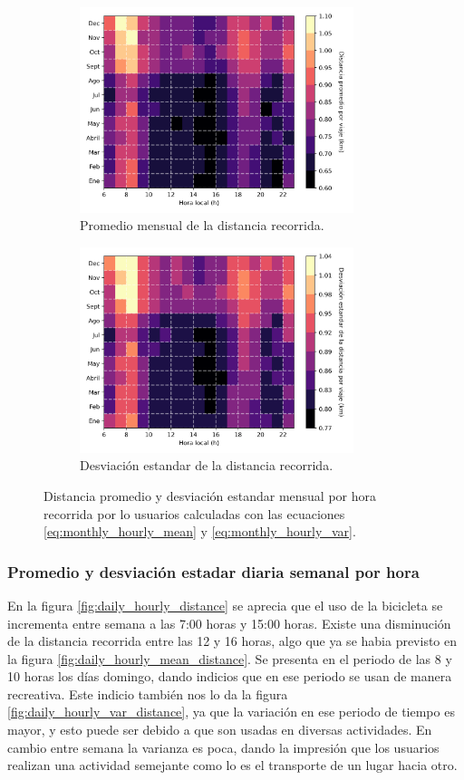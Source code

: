 \begin{figure}[H]
    \centering
    \begin{subfigure}[b]{8cm}
        \includegraphics[width=8cm]{Graphics/monthly_hourly_mean_distance.png}
        \caption{Promedio mensual de la distancia recorrida.}
        \label{fig:monthly_hourly_mean_distance}
    \end{subfigure}
    \begin{subfigure}[b]{8.5cm}
        \includegraphics[width=8cm]{Graphics/monthly_hourly_var_distance.png}
        \caption{Desviación estandar de la distancia recorrida.}
        \label{fig:monthly_hourly_var_distance}
    \end{subfigure}
    \caption{Distancia promedio y desviación estandar mensual por hora recorrida por lo usuarios calculadas con las ecuaciones \ref{eq:monthly_hourly_mean} y \ref{eq:monthly_hourly_var}.}
    \label{fig:monthly_hourly_distance}
\end{figure}

\subsubsection{Promedio y desviación estadar diaria semanal por hora}

En la figura \ref{fig:daily_hourly_distance} se aprecia que el uso de la bicicleta se incrementa entre semana a las 7:00 horas y 15:00 horas. Existe una disminución de la distancia recorrida entre las 12 y 16 horas, algo que ya se habia previsto en la figura \ref{fig:daily_hourly_mean_distance}. Se presenta en el periodo de las 8 y 10 horas los días domingo, dando indicios que en ese periodo se usan de manera recreativa. Este indicio también nos lo da la figura \ref{fig:daily_hourly_var_distance}, ya que la variación en ese periodo de tiempo es mayor, y esto puede ser debido a que son usadas en diversas actividades. En cambio entre semana la varianza es poca, dando la impresión que los usuarios realizan una actividad semejante como lo es el transporte de un lugar hacia otro.

